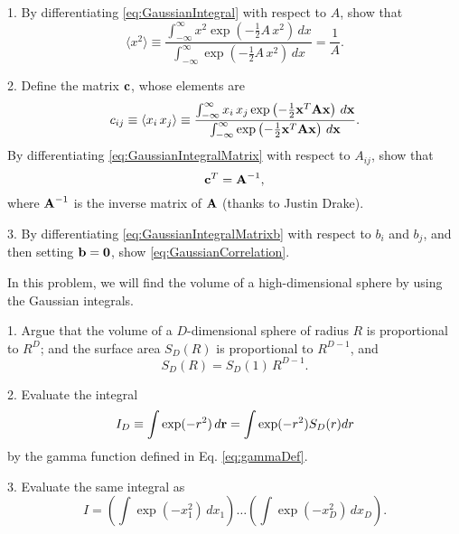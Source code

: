 \documentclass[12pt]{book}
\begin{document}

1. By differentiating \eqref{eq:GaussianIntegral} with respect to $A$, show that
\begin{equation}
  \langle x^2 \rangle
\equiv \frac {
  \int_{-\infty}^{\infty}
    x^2 \exp\left( - \frac{1}{2} A\,x^2 \right) \, dx
} {
  \int_{-\infty}^{\infty}
  \exp\left( - \frac{1}{2} A\,x^2 \right) \, dx
}
=
\frac{1}{A}.
\end{equation}

2.
Define the matrix $\boldsymbol{\mathbf{c}}$, whose elements are
\begin{equation*}
c_{ij}
\equiv \langle x_i \, x_j \rangle
\equiv \frac {
  \int_{-\infty}^{\infty}
    x_i \, x_j \exp\left( -\frac{1}{2} \boldsymbol{\mathbf{x}}^T \boldsymbol{\mathbf{A}} \boldsymbol{\mathbf{x}} \right) \, d\boldsymbol{\mathbf{x}}
} {
\int_{-\infty}^{\infty}
  \exp\left( -\frac{1}{2} \boldsymbol{\mathbf{x}}^T \boldsymbol{\mathbf{A}} \boldsymbol{\mathbf{x}} \right) \, d\boldsymbol{\mathbf{x}}
}.
\end{equation*}
%
By differentiating \eqref{eq:GaussianIntegralMatrix} with respect to $A_{ij}$, show that
%
\begin{equation}
  \boldsymbol{\mathbf{c}}^T = \boldsymbol{\mathbf{A}}^{-1},
  \label{eq:GaussianCorrelation}
\end{equation}
%
where
$\boldsymbol{\mathbf{A}}^{-1}$ is the inverse matrix of $\boldsymbol{\mathbf{A}}$
(thanks to Justin Drake).


3. By differentiating \eqref{eq:GaussianIntegralMatrixb} with respect to $b_i$ and $b_j$,
and then setting $\boldsymbol{\mathbf{b}} = \boldsymbol{\mathbf{0}}$, show \eqref{eq:GaussianCorrelation}.








In this problem, we will find the volume of a high-dimensional sphere
by using the Gaussian integrals.

1. Argue that the volume of a $D$-dimensional sphere of radius $R$ is proportional to
$R^D$; and the surface area $S_D(R)$ is proportional to $R^{D-1}$, and
\[
  S_D(R) = S_D(1) \, R^{D-1}.
\]

2. Evaluate the integral
\[
  I_D \equiv \int \exp(-r^2) \, d\boldsymbol{\mathbf{r}} = \int \exp(-r^2) S_D(r) dr
\]
by the gamma function defined in Eq. \eqref{eq:gammaDef}.

3. Evaluate the same integral as
\[
  I
  =
\left( \int \exp(-x_1^2) \, d x_1 \right)
\dots
\left( \int \exp(-x_D^2) \, d x_D \right).
\]
\end{document}
